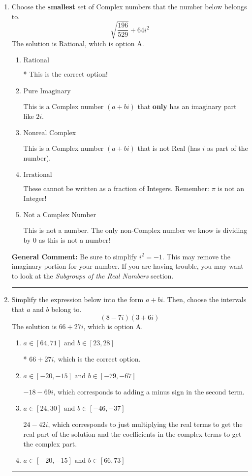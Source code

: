 \documentclass{extbook}[14pt]
\newcommand{\litem}[1]{\item #1

\rule{\textwidth}{0.4pt}}
\begin{document}
\begin{enumerate}\litem{
Choose the \textbf{smallest} set of Complex numbers that the number below belongs to.
\[ \sqrt{\frac{196}{529}} + 64i^2 \]The solution is \( \text{Rational} \), which is option A.\begin{enumerate}[label=\Alph*.]
\item \( \text{Rational} \)

* This is the correct option!
\item \( \text{Pure Imaginary} \)

This is a Complex number $(a+bi)$ that \textbf{only} has an imaginary part like $2i$.
\item \( \text{Nonreal Complex} \)

This is a Complex number $(a+bi)$ that is not Real (has $i$ as part of the number).
\item \( \text{Irrational} \)

These cannot be written as a fraction of Integers. Remember: $\pi$ is not an Integer!
\item \( \text{Not a Complex Number} \)

This is not a number. The only non-Complex number we know is dividing by 0 as this is not a number!
\end{enumerate}

\textbf{General Comment:} Be sure to simplify $i^2 = -1$. This may remove the imaginary portion for your number. If you are having trouble, you may want to look at the \textit{Subgroups of the Real Numbers} section.
}
\litem{
Simplify the expression below into the form $a+bi$. Then, choose the intervals that $a$ and $b$ belong to.
\[ (8 - 7 i)(3 + 6 i) \]The solution is \( 66 + 27 i \), which is option A.\begin{enumerate}[label=\Alph*.]
\item \( a \in [64, 71] \text{ and } b \in [23, 28] \)

* $66 + 27 i$, which is the correct option.
\item \( a \in [-20, -15] \text{ and } b \in [-79, -67] \)

 $-18 - 69 i$, which corresponds to adding a minus sign in the second term.
\item \( a \in [24, 30] \text{ and } b \in [-46, -37] \)

 $24 - 42 i$, which corresponds to just multiplying the real terms to get the real part of the solution and the coefficients in the complex terms to get the complex part.
\item \( a \in [-20, -15] \text{ and } b \in [66, 73] \)


\end{enumerate}}
\end{enumerate}
\end{document}
